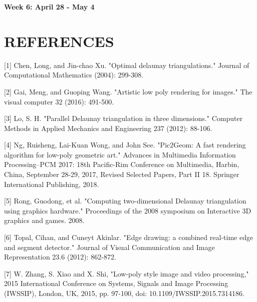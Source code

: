 \documentclass[12pt]{article}
\theoremstyle{definition}
\theoremstyle{plain}
\begin{document}
{\bf Week 6: April 28 - May 4}


\section{REFERENCES}

[1] Chen, Long, and Jin-chao Xu. "Optimal delaunay triangulations." Journal of Computational Mathematics (2004): 299-308.

[2] Gai, Meng, and Guoping Wang. "Artistic low poly rendering for images." The visual computer 32 (2016): 491-500.

[3] Lo, S. H. "Parallel Delaunay triangulation in three dimensions." Computer Methods in Applied Mechanics and Engineering 237 (2012): 88-106.

[4] Ng, Ruisheng, Lai-Kuan Wong, and John See. "Pic2Geom: A fast rendering algorithm for low-poly geometric art." Advances in Multimedia Information Processing–PCM 2017: 18th Pacific-Rim Conference on Multimedia, Harbin, China, September 28-29, 2017, Revised Selected Papers, Part II 18. Springer International Publishing, 2018.

[5] Rong, Guodong, et al. "Computing two-dimensional Delaunay triangulation using graphics hardware." Proceedings of the 2008 symposium on Interactive 3D graphics and games. 2008.

[6] Topal, Cihan, and Cuneyt Akinlar. "Edge drawing: a combined real-time edge and segment detector." Journal of Visual Communication and Image Representation 23.6 (2012): 862-872.

[7] W. Zhang, S. Xiao and X. Shi, "Low-poly style image and video processing," 2015 International Conference on Systems, Signals and Image Processing (IWSSIP), London, UK, 2015, pp. 97-100, doi: 10.1109/IWSSIP.2015.7314186.
\end{document}

